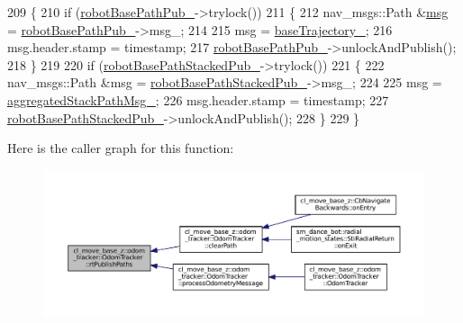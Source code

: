 \begin{DoxyCode}
209 \{
210     \textcolor{keywordflow}{if} (\hyperlink{classcl__move__base__z_1_1odom__tracker_1_1OdomTracker_a40a7cbb6bb6595e250e7c685c781613b}{robotBasePathPub\_}->trylock())
211     \{
212         nav\_msgs::Path &\hyperlink{namespacebattery__monitor__node_ab1920c64448816edd4064e494275fdff}{msg} = \hyperlink{classcl__move__base__z_1_1odom__tracker_1_1OdomTracker_a40a7cbb6bb6595e250e7c685c781613b}{robotBasePathPub\_}->msg\_;
214 
215         msg = \hyperlink{classcl__move__base__z_1_1odom__tracker_1_1OdomTracker_a466d18a86df049f0f680e043bb5ea91f}{baseTrajectory\_};
216         msg.header.stamp = timestamp;
217         \hyperlink{classcl__move__base__z_1_1odom__tracker_1_1OdomTracker_a40a7cbb6bb6595e250e7c685c781613b}{robotBasePathPub\_}->unlockAndPublish();
218     \}
219 
220     \textcolor{keywordflow}{if} (\hyperlink{classcl__move__base__z_1_1odom__tracker_1_1OdomTracker_a7a2fb23e835ba7d63e69c8db819be876}{robotBasePathStackedPub\_}->trylock())
221     \{
222         nav\_msgs::Path &msg = \hyperlink{classcl__move__base__z_1_1odom__tracker_1_1OdomTracker_a7a2fb23e835ba7d63e69c8db819be876}{robotBasePathStackedPub\_}->msg\_;
224 
225         msg = \hyperlink{classcl__move__base__z_1_1odom__tracker_1_1OdomTracker_a0fb60113ace2791a1f1bbeed59946404}{aggregatedStackPathMsg\_};
226         msg.header.stamp = timestamp;
227         \hyperlink{classcl__move__base__z_1_1odom__tracker_1_1OdomTracker_a7a2fb23e835ba7d63e69c8db819be876}{robotBasePathStackedPub\_}->unlockAndPublish();
228     \}
229 \}
\end{DoxyCode}
Here is the caller graph for this function\+:
\nopagebreak
\begin{figure}[H]
\begin{center}
\leavevmode
\includegraphics[width=350pt]{classcl__move__base__z_1_1odom__tracker_1_1OdomTracker_a8f728f85d1f3f49f4b94e37052a59d6d_icgraph}
\end{center}
\end{figure}
\mbox{\label{classcl__move__base__z_1_1odom__tracker_1_1OdomTracker_a3b3cf9010e4e4fe4f96cfafd5a529517}} 
